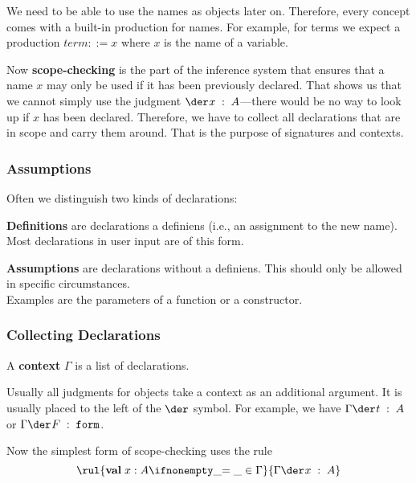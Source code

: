 We need to be able to use the names as objects later on.
Therefore, every concept comes with a built-in production for names.
For example, for terms we expect a production $term::=x$ where $x$ is the name of a variable.

Now \textbf{scope-checking} is the part of the inference system that ensures that a name $x$ may only be used if it has been previously declared.
That shows us that we cannot simply use the judgment $\oftype{}{}{x}{A}$---there would be no way to look up if $x$ has been declared.
Therefore, we have to collect all declarations that are in scope and carry them around.
That is the purpose of signatures and contexts.

\subsubsection{Assumptions}

Often we distinguish two kinds of declarations:
\begin{compactitem}
 \item \textbf{Definitions} are declarations a definiens (i.e., an assignment to the new name). Most declarations in user input are of this form.
 \item \textbf{Assumptions} are declarations without a definiens.
 This should only be allowed in specific circumstances.\\
 Examples are the parameters of a function or a constructor.
\end{compactitem}

\subsubsection{Collecting Declarations}

A \textbf{context} $\Gamma$ is a list of declarations.

Usually all judgments for objects take a context as an additional argument.
It is usually placed to the left of the $\der$ symbol.
For example, we have $\oftype{}{\Gamma}{t}{A}$ or $\oftype{}{\Gamma}{F}{\form}$.
\medskip

Now the simplest form of scope-checking uses the rule
\[\rul{\aval{x}{A}{\_}\in \Gamma}{\oftype{}{\Gamma}{x}{A}}\]

